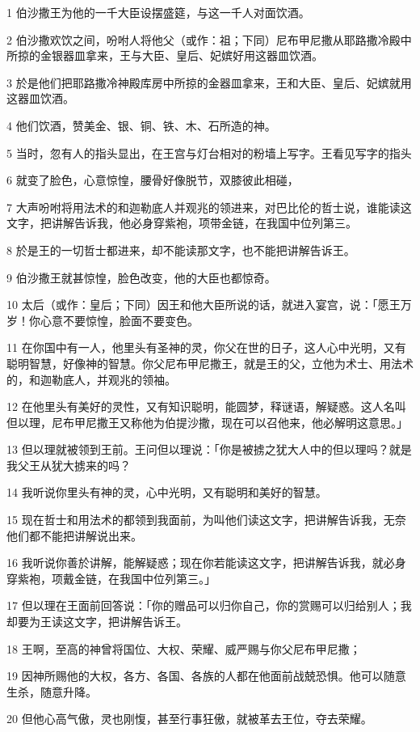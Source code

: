 \par 1 伯沙撒王为他的一千大臣设摆盛筵，与这一千人对面饮酒。
\par 2 伯沙撒欢饮之间，吩咐人将他父（或作：祖；下同）尼布甲尼撒从耶路撒冷殿中所掠的金银器皿拿来，王与大臣、皇后、妃嫔好用这器皿饮酒。
\par 3 於是他们把耶路撒冷神殿库房中所掠的金器皿拿来，王和大臣、皇后、妃嫔就用这器皿饮酒。
\par 4 他们饮酒，赞美金、银、铜、铁、木、石所造的神。
\par 5 当时，忽有人的指头显出，在王宫与灯台相对的粉墙上写字。王看见写字的指头
\par 6 就变了脸色，心意惊惶，腰骨好像脱节，双膝彼此相碰，
\par 7 大声吩咐将用法术的和迦勒底人并观兆的领进来，对巴比伦的哲士说，谁能读这文字，把讲解告诉我，他必身穿紫袍，项带金链，在我国中位列第三。
\par 8 於是王的一切哲士都进来，却不能读那文字，也不能把讲解告诉王。
\par 9 伯沙撒王就甚惊惶，脸色改变，他的大臣也都惊奇。
\par 10 太后（或作：皇后；下同）因王和他大臣所说的话，就进入宴宫，说：「愿王万岁！你心意不要惊惶，脸面不要变色。
\par 11 在你国中有一人，他里头有圣神的灵，你父在世的日子，这人心中光明，又有聪明智慧，好像神的智慧。你父尼布甲尼撒王，就是王的父，立他为术士、用法术的，和迦勒底人，并观兆的领袖。
\par 12 在他里头有美好的灵性，又有知识聪明，能圆梦，释谜语，解疑惑。这人名叫但以理，尼布甲尼撒王又称他为伯提沙撒，现在可以召他来，他必解明这意思。」
\par 13 但以理就被领到王前。王问但以理说：「你是被掳之犹大人中的但以理吗？就是我父王从犹大掳来的吗？
\par 14 我听说你里头有神的灵，心中光明，又有聪明和美好的智慧。
\par 15 现在哲士和用法术的都领到我面前，为叫他们读这文字，把讲解告诉我，无奈他们都不能把讲解说出来。
\par 16 我听说你善於讲解，能解疑惑；现在你若能读这文字，把讲解告诉我，就必身穿紫袍，项戴金链，在我国中位列第三。」
\par 17 但以理在王面前回答说：「你的赠品可以归你自己，你的赏赐可以归给别人；我却要为王读这文字，把讲解告诉王。
\par 18 王啊，至高的神曾将国位、大权、荣耀、威严赐与你父尼布甲尼撒；
\par 19 因神所赐他的大权，各方、各国、各族的人都在他面前战兢恐惧。他可以随意生杀，随意升降。
\par 20 但他心高气傲，灵也刚愎，甚至行事狂傲，就被革去王位，夺去荣耀。
